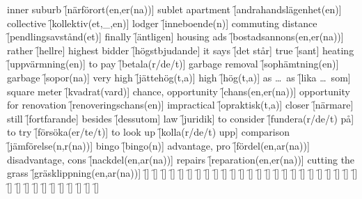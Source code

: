\begin{questions}
\begin{multicols}{2}
        \question inner suburb \f[närförort(en,er(na))]
        \question sublet apartment \f[andrahandslägenhet(en)]
        \question collective \f[kollektiv(et,\_,en)]
        \question lodger \f[inneboende(n)]
        \question commuting distance \f[pendlingsavstånd(et)]
        \question finally \f[äntligen]
        \question housing ads \f[bostadsannons(en,er(na))]
        \question rather \f[hellre]
        \question highest bidder \f[högstbjudande]
        \question it says \f[det står]
        \question true \f[sant]
        \question heating \f[uppvärmning(en)]
        \question to pay \f[betala(r/de/t)]
        \question garbage removal \f[sophämtning(en)]
        \question garbage \f[sopor(na)]
        \question very high \f[jättehög(t,a)]
        \question high \f[hög(t,a)]
        \question as \ldots\ as \f[lika \ldots\ som]
        \question square meter \f[kvadrat(vard)]
        \question chance, opportunity \f[chans(en,er(na))]
        \question opportunity for renovation \f[renoveringschans(en)]
        \question impractical \f[opraktisk(t,a)]
        \question closer \f[närmare]
        \question still \f[fortfarande]
        \question besides \f[dessutom]
        \question law \f[juridik]
        \question to consider \f[fundera(r/de/t) på]
        \question to try \f[försöka(er/te/t)]
        \question to look up \f[kolla(r/de/t) upp]
        \question comparison \f[jämförelse(n,r(na))]
        \question bingo \f[bingo(n)]
        \question advantage, pro \f[fördel(en,ar(na))]
        \question disadvantage, cons \f[nackdel(en,ar(na))]
        \question repairs \f[reparation(en,er(na))]
        \question cutting the grass \f[gräsklippning(en,ar(na))]
        \question  \f[]
        \question  \f[]
        \question  \f[]
        \question  \f[]
        \question  \f[]
        \question  \f[]
        \question  \f[]
        \question  \f[]
        \question  \f[]
        \question  \f[]
        \question  \f[]
        \question  \f[]
        \question  \f[]
        \question  \f[]
        \question  \f[]
        \question  \f[]
        \question  \f[]
        \question  \f[]
        \question  \f[]
        \question  \f[]
        \question  \f[]
        \question  \f[]
        \question  \f[]
        \question  \f[]
        \question  \f[]
        \question  \f[]
        \question  \f[]
        \question  \f[]
        \question  \f[]
        \question  \f[]
        \question  \f[]
        \question  \f[]
        \question  \f[]
        \question  \f[]
        \question  \f[]
        \question  \f[]
    \end{multicols}
\end{questions}
